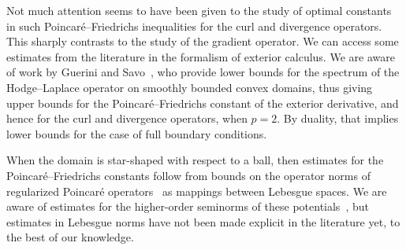 \documentclass[10pt,letterpaper]{article}
\begin{document}
Not much attention seems to have been given to the study of optimal constants in such Poincar\'e--Friedrichs inequalities for the curl and divergence operators. 
This sharply contrasts to the study of the gradient operator. 
%
We can access some estimates from the literature in the formalism of exterior calculus. 
We are aware of work by Guerini and Savo~\cite{guerini2004eigenvalue},
who provide lower bounds for the spectrum of the Hodge--Laplace operator on smoothly bounded convex domains, 
thus giving upper bounds for the Poincar\'e--Friedrichs constant of the exterior derivative, and hence for the curl and divergence operators, when $p=2$.
By duality, that implies lower bounds for the case of full boundary conditions.

When the domain is star-shaped with respect to a ball, then estimates for the Poincar\'e--Friedrichs constants 
follow from bounds on the operator norms of regularized Poincar\'e operators~\cite{costabel2010bogovskiui}
as mappings between Lebesgue spaces. 
We are aware of estimates for the higher-order seminorms of these potentials~\cite{guzman2021estimation},
but estimates in Lebesgue norms have not been made explicit in the literature yet, to the best of our knowledge.
\\
\end{document}

